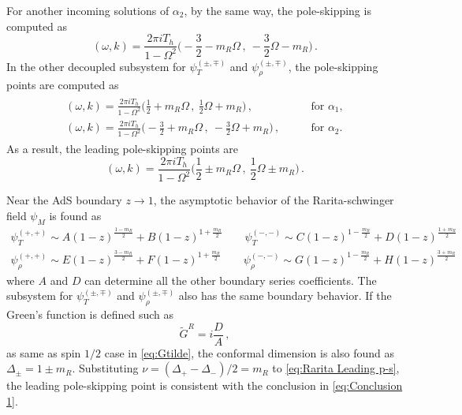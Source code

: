 \documentclass[11pt,a4paper]{article}
\newcommand{\ra}{\rightarrow}
\begin{document}
For another incoming solutions of $\alpha_2$, by the same way, the pole-skipping is computed as 
\begin{equation}
    (\omega, k)=\frac{2\pi i T_h}{1-\Omega^2}\bigg( -\frac{3}{2} - m_R \Omega\,,~ -\frac{3}{2}\Omega - m_R \bigg)\,.
\end{equation}
In the other decoupled subsystem for $\psi_T^{(\pm,\mp)}$ and $\psi_\rho^{(\pm,\mp)}$, the pole-skipping points are computed as
\begin{align}
\begin{split}
    (\omega, k)=\frac{2\pi i T_h}{1-\Omega^2}\bigg( \frac{1}{2} + m_R \Omega\,,~ \frac{1}{2}\Omega + m_R \bigg)\,, \qquad
    & \text{for } \alpha_1, \\
    (\omega, k)=\frac{2\pi i T_h}{1-\Omega^2}\bigg( -\frac{3}{2} + m_R \Omega\,,~ -\frac{3}{2}\Omega + m_R \bigg)\,, \qquad
    & \text{for } \alpha_2.
\end{split}
\end{align}
As a result, the leading pole-skipping points are
\begin{equation}\label{eq:Rarita Leading p-s}
    (\omega, k)=\frac{2\pi i T_h}{1-\Omega^2}\bigg( \frac{1}{2} \pm m_R \Omega\,,~ \frac{1}{2}\Omega \pm m_R \bigg)\,.
\end{equation}

Near the AdS boundary $z\ra 1$, the asymptotic behavior of the Rarita-schwinger field $\psi_M$ is found as
\begin{equation}
    \begin{split}
        \psi_T^{(+,+)} \sim A (1-z)^{\frac{1-m_R}{2}} + B (1-z)^{1+\frac{m_R}{2}} \qquad \psi_T^{(-,-)} \sim C (1-z)^{1-\frac{m_R}{2}} + D (1-z)^{\frac{1+m_R}{2}} \\
        \psi_\rho^{(+,+)} \sim E (1-z)^{\frac{3-m_R}{2}} + F (1-z)^{1+\frac{m_R}{2}} \qquad \psi_\rho^{(-,-)} \sim G (1-z)^{1-\frac{m_R}{2}} + H (1-z)^{\frac{3+m_R}{2}}
    \end{split}
\end{equation}
where $A$ and $D$ can determine all the other boundary series coefficients. The subsystem for $\psi_T^{(\pm,\mp)}$ and $\psi_\rho^{(\pm,\mp)}$ also has the same boundary behavior. If the Green's function is defined such as
\begin{equation}
    \tilde{G}^R = i \frac{D}{A}\,,
\end{equation}
as same as spin $1/2$ case in \eqref{eq:Gtilde}, the conformal dimension is also found as $\Delta_{\pm}=1\pm m_R$. Substituting $\nu=(\Delta_+ - \Delta_-)/2=m_R$ to \eqref{eq:Rarita Leading p-s}, the leading pole-skipping point is consistent with the conclusion in \eqref{eq:Conclusion 1}.
\end{document}
